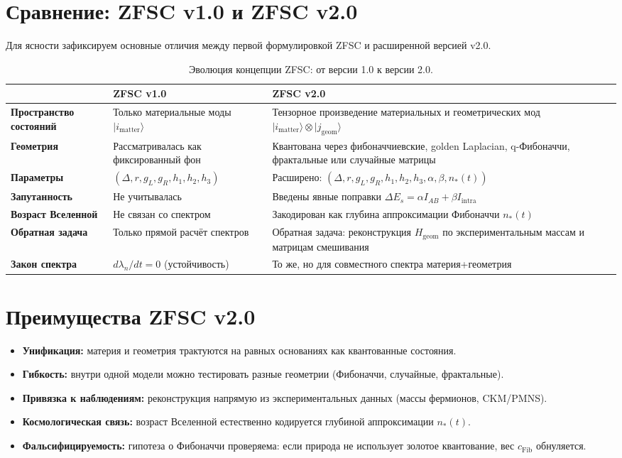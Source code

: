 \section{Сравнение: ZFSC v1.0 и ZFSC v2.0}

Для ясности зафиксируем основные отличия между первой формулировкой ZFSC и расширенной версией v2.0.

\begin{table}[h!]
\centering
\begin{tabular}{@{}p{4cm}p{5.5cm}p{5.5cm}@{}}
\toprule
 & \textbf{ZFSC v1.0} & \textbf{ZFSC v2.0} \\
\midrule
\textbf{Пространство состояний} & Только материальные моды $|i_{\mathrm{matter}}\rangle$ & Тензорное произведение материальных и геометрических мод $|i_{\mathrm{matter}}\rangle \otimes |j_{\mathrm{geom}}\rangle$ \\
\textbf{Геометрия} & Рассматривалась как фиксированный фон & Квантована через фибоначчиевские, golden Laplacian, q-Фибоначчи, фрактальные или случайные матрицы \\
\textbf{Параметры} & $(\Delta, r, g_L, g_R, h_1,h_2,h_3)$ & Расширено: $(\Delta, r, g_L, g_R, h_1,h_2,h_3, \alpha, \beta, n_*(t))$ \\
\textbf{Запутанность} & Не учитывалась & Введены явные поправки $\Delta E_s = \alpha I_{AB} + \beta I_{\mathrm{intra}}$ \\
\textbf{Возраст Вселенной} & Не связан со спектром & Закодирован как глубина аппроксимации Фибоначчи $n_*(t)$ \\
\textbf{Обратная задача} & Только прямой расчёт спектров & Обратная задача: реконструкция $H_{\mathrm{geom}}$ по экспериментальным массам и матрицам смешивания \\
\textbf{Закон спектра} & $d\lambda_n/dt = 0$ (устойчивость) & То же, но для совместного спектра материя+геометрия \\
\bottomrule
\end{tabular}
\caption{Эволюция концепции ZFSC: от версии 1.0 к версии 2.0.}
\end{table}

\section{Преимущества ZFSC v2.0}
\begin{itemize}
    \item \textbf{Унификация:} материя и геометрия трактуются на равных основаниях как квантованные состояния.  
    \item \textbf{Гибкость:} внутри одной модели можно тестировать разные геометрии (Фибоначчи, случайные, фрактальные).  
    \item \textbf{Привязка к наблюдениям:} реконструкция напрямую из экспериментальных данных (массы фермионов, CKM/PMNS).  
    \item \textbf{Космологическая связь:} возраст Вселенной естественно кодируется глубиной аппроксимации $n_*(t)$.  
    \item \textbf{Фальсифицируемость:} гипотеза о Фибоначчи проверяема: если природа не использует золотое квантование, вес $c_{\mathrm{Fib}}$ обнуляется.  
\end{itemize}

